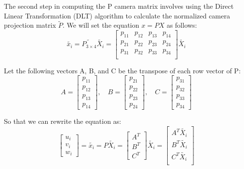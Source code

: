 \documentclass[12pt]{article}
\begin{document}
\noindent The second step in computing the P camera matrix involves using the Direct Linear Transformation (DLT) algorithm to calculate the normalized camera projection matrix \( \tilde{P} \). We will set the equation \( x = PX \) as follows:
\[ 
\tilde{x_i} = \tilde{P_{3 \times 4}} \tilde{X_i} = 
\begin{bmatrix}
p_{11} & p_{12} & p_{13} & p_{14} \\
p_{21} & p_{22} & p_{23} & p_{24} \\
p_{31} & p_{32} & p_{33} & p_{34} \\
\end{bmatrix} \tilde{X_i}
\]

\noindent Let the following vectors A, B, and C be the transpose of each row vector of P:
\[ 
A = 
\begin{bmatrix}
p_{11} \\ p_{12} \\ p_{13} \\ p_{14}
\end{bmatrix}
, \quad B = 
\begin{bmatrix}
p_{21} \\ p_{22} \\ p_{23} \\ p_{24}
\end{bmatrix}
, \quad C = 
\begin{bmatrix}
p_{31} \\ p_{32} \\ p_{33} \\ p_{34}
\end{bmatrix}
\]

\noindent So that we can rewrite the equation as:
\[
\begin{bmatrix}
u_{i} \\ v_{i} \\ w_{i}
\end{bmatrix} = \tilde{x_i}=P\tilde{X_i} = 
\begin{bmatrix}
A^{T} \\ B^{T} \\ C^{T}
\end{bmatrix} \tilde{X_i} = 
\begin{bmatrix}
A^T \tilde{X_i} \\
B^T \tilde{X_i} \\
C^T \tilde{X_i} \\
\end{bmatrix}
\]\\
\end{document}
